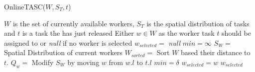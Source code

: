 \begin{algorithm}
\caption{OnlineTASC($W, S_T, t$)}
\label{algo:OnlineTASC}
\begin{algorithmic}[1]
\REQUIRE $W$ is the set of currently available workers, $S_T$ is the spatial distribution of tasks and $t$ is a task the has just released
\ENSURE Either $w \in W$ as the worker task $t$ should be assigned to or \emph{null} if no worker is selected
\STATE $w_{selected} = $ \emph{null}
\STATE $min = \infty$
\STATE $S_W = $ Spatial Distribution of current workers
\STATE $W_{sorted} = $ Sort $W$ based their distance to $t$.
	\STATE $Q_w = $ Modify $S_W$ by moving $w$ from $w.l$ to $t.l$
			\STATE $min = \delta$
			\STATE $w_{selected} = w$
		\ENDIF
	\ENDIF
\ENDFOR
\RETURN $w_{selected}$
\end{algorithmic}
\end{algorithm}
